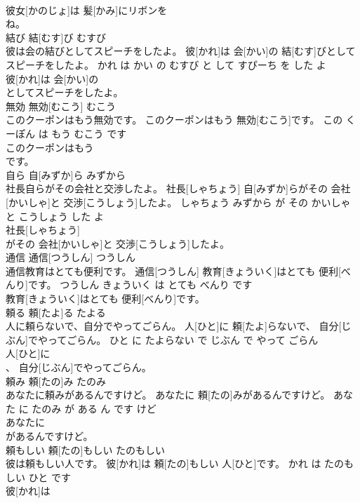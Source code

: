 \documentclass[8pt]{extreport}
\begin{document}
\begin{CJK}{UTF8}{min}
\\	彼女[かのじょ]は 髪[かみ]にリボンを
\\	ね。			
\\	結び	結[むす]び	むすび	
\\	彼は会の結びとしてスピーチをしたよ。	彼[かれ]は 会[かい]の 結[むす]びとしてスピーチをしたよ。	かれ は かい の むすび と して すぴーち を した よ	
\\	彼[かれ]は 会[かい]の
\\	としてスピーチをしたよ。			
\\	無効	無効[むこう]	むこう	
\\	このクーポンはもう無効です。	このクーポンはもう 無効[むこう]です。	この くーぽん は もう むこう です	
\\	このクーポンはもう
\\	です。			
\\	自ら	自[みずか]ら	みずから	
\\	社長自らがその会社と交渉したよ。	社長[しゃちょう] 自[みずか]らがその 会社[かいしゃ]と 交渉[こうしょう]したよ。	しゃちょう みずから が その かいしゃ と こうしょう した よ	
\\	社長[しゃちょう]
\\	がその 会社[かいしゃ]と 交渉[こうしょう]したよ。			
\\	通信	通信[つうしん]	つうしん	
\\	通信教育はとても便利です。	通信[つうしん] 教育[きょういく]はとても 便利[べんり]です。	つうしん きょういく は とても べんり です	
\\	教育[きょういく]はとても 便利[べんり]です。			
\\	頼る	頼[たよ]る	たよる	
\\	人に頼らないで、自分でやってごらん。	人[ひと]に 頼[たよ]らないで、 自分[じぶん]でやってごらん。	ひと に たよらない で じぶん で やって ごらん	
\\	人[ひと]に
\\	、 自分[じぶん]でやってごらん。			
\\	頼み	頼[たの]み	たのみ	
\\	あなたに頼みがあるんですけど。	あなたに 頼[たの]みがあるんですけど。	あなた に たのみ が ある ん です けど	
\\	あなたに
\\	があるんですけど。			
\\	頼もしい	頼[たの]もしい	たのもしい	
\\	彼は頼もしい人です。	彼[かれ]は 頼[たの]もしい 人[ひと]です。	かれ は たのもしい ひと です	
\\	彼[かれ]は

\end{CJK}
\end{document}
